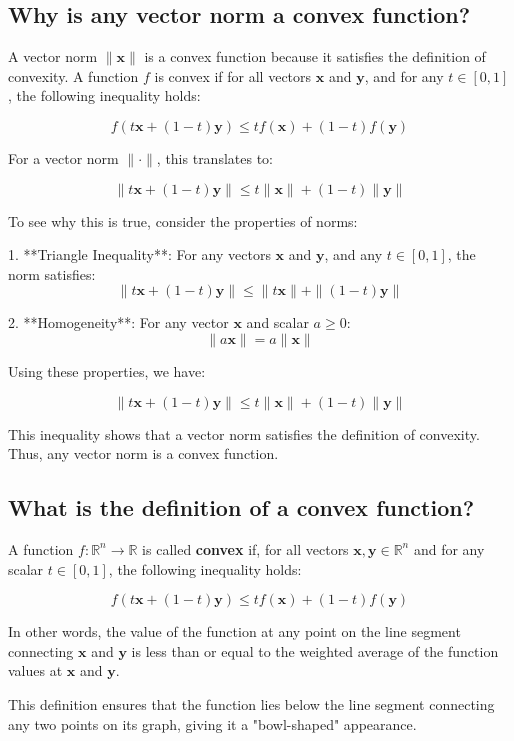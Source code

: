 \subsection{Why is any vector norm a convex function?}
A vector norm $\|\mathbf{x}\|$ is a convex function because it satisfies the definition of convexity. A function $f$ is convex if for all vectors $\mathbf{x}$ and $\mathbf{y}$, and for any $t \in [0, 1]$, the following inequality holds:

\[
f(t \mathbf{x} + (1 - t) \mathbf{y}) \leq t f(\mathbf{x}) + (1 - t) f(\mathbf{y})
\]

For a vector norm $\|\cdot\|$, this translates to:

\[
\|t \mathbf{x} + (1 - t) \mathbf{y}\| \leq t \|\mathbf{x}\| + (1 - t) \|\mathbf{y}\|
\]

To see why this is true, consider the properties of norms:

1. **Triangle Inequality**: For any vectors $\mathbf{x}$ and $\mathbf{y}$, and any $t \in [0, 1]$, the norm satisfies:
   \[
   \|t \mathbf{x} + (1 - t) \mathbf{y}\| \leq \|t \mathbf{x}\| + \|(1 - t) \mathbf{y}\|
   \]

2. **Homogeneity**: For any vector $\mathbf{x}$ and scalar $a \geq 0$:
   \[
   \|a \mathbf{x}\| = a \|\mathbf{x}\|
   \]

Using these properties, we have:

\[
\|t \mathbf{x} + (1 - t) \mathbf{y}\| \leq t \|\mathbf{x}\| + (1 - t) \|\mathbf{y}\|
\]

This inequality shows that a vector norm satisfies the definition of convexity. Thus, any vector norm is a convex function.


\subsection{What is the definition of a convex function?}
A function $f: \mathbb{R}^n \to \mathbb{R}$ is called \textbf{convex} if, for all vectors $\mathbf{x}, \mathbf{y} \in \mathbb{R}^n$ and for any scalar $t \in [0, 1]$, the following inequality holds:

\[
f(t \mathbf{x} + (1 - t) \mathbf{y}) \leq t f(\mathbf{x}) + (1 - t) f(\mathbf{y})
\]

In other words, the value of the function at any point on the line segment connecting $\mathbf{x}$ and $\mathbf{y}$ is less than or equal to the weighted average of the function values at $\mathbf{x}$ and $\mathbf{y}$.

This definition ensures that the function lies below the line segment connecting any two points on its graph, giving it a "bowl-shaped" appearance.


